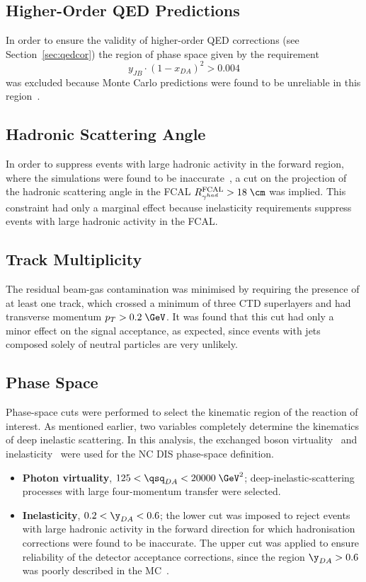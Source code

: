 \subsection{Higher-Order QED Predictions}
\label{subsec:qedcorcut}
In order to ensure the validity of higher-order QED corrections (see Section~\ref{sec:qedcor}) the region of phase space given by the requirement 
\begin{equation}
y_{JB}\cdot\left(1-x_{DA}\right)^2>0.004
\end{equation}
was excluded because Monte Carlo predictions were found to be unreliable in this region~\cite{cpc:81:381}.

\subsection{Hadronic Scattering Angle}
\label{subsec:gammahadcut}
In order to suppress events with large hadronic activity in the forward region, where the simulations were found to be inaccurate~\cite{thesis:jose:2003}, a cut on the projection of the hadronic scattering angle in the FCAL $R^\text{FCAL}_{\gamma^{had}} > 18\;\cm$ was implied. This constraint had only a marginal effect because inelasticity requirements suppress events with large hadronic activity in the FCAL.

\subsection{Track Multiplicity}
\label{subsec:trackmultcut}
The residual beam-gas contamination was minimised by requiring the presence of at least one track, which crossed a minimum of three CTD superlayers and had transverse momentum $p_T>0.2\;\GeV$. It was found that this cut had only a minor effect on the signal acceptance, as expected, since events with jets composed solely of neutral particles are very unlikely.

\subsection{Phase Space}
\label{subsec:phasespace}
Phase-space cuts were performed to select the kinematic region of the reaction of interest. As mentioned earlier, two variables completely determine the kinematics of deep inelastic scattering. In this analysis, the exchanged boson virtuality \qsq~and inelasticity \y~were used for the NC DIS phase-space definition.
\begin{itemize}
	\item \textbf{Photon virtuality}, $125 < \qsq_{DA} < 20000\;\GeV^2$;  deep-inelastic-scattering processes with large four-momentum transfer were selected.
	\item \textbf{Inelasticity}, $0.2 < \y_{DA} < 0.6$; the lower cut was imposed to reject events with large hadronic activity in the forward direction for which hadronisation corrections were found to be inaccurate. The upper cut was applied to ensure reliability of the detector acceptance corrections, since the region $\y_{DA} > 0.6$ was poorly described in the MC~\cite{thesis:behr:2010}.
\end{itemize}

